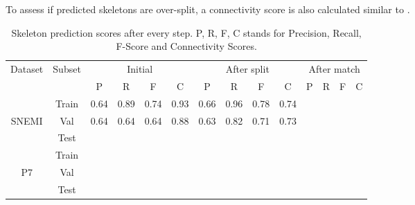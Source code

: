 To assess if predicted skeletons are over-split, a connectivity score is also calculated similar to \cite{Liang2019}.



\begin{table*}[!ht]                                                                                          
	\centering
	\begin{adjustbox}{width=\textwidth,center=\textwidth}
	\begin{tabular}{|c|c|c|c|c|c|c|c|c|c|c|c|c|c|}                                                                      
		\hline                                                                                                  
		\multirow{2}{*}{Dataset} & \multirow{2}{*}{Subset} & \multicolumn{4}{c|}{Initial}  & \multicolumn{4}{c|}{After split}  & \multicolumn{4}{c|}{After match} \\                                    
		\cline{3-14}                                                                                                  
		&  & P & R & F & C & P & R & F & C & P & R & F & C \\                                                           
		\hline                                                                                                  
		\hline                                                                                                  
				& Train & 0.64 & 0.89 & 0.74 & 0.93 & 0.66 & 0.96 & 0.78 & 0.74 &  &  &  &\\                           
		SNEMI 	& Val 	& 0.64 & 0.64 & 0.64 & 0.88 & 0.63 & 0.82 & 0.71 & 0.73 &  &  &  & \\           
				& Test 	&  &  &  &  &  &  &  &  &  &  &  & \\
		\hline		 
				& Train &  &  &  &  &  &  &  &  &  &  &  & \\                           
		P7 		& Val 	&  &  &  &  &  &  &  &  &  &  &  & \\           
				& Test 	&  &  &  &  &  &  &  &  &  &  &  & \\                          
		\hline                                                                                                     
	\end{tabular}
	\end{adjustbox}                                                
	\caption{Skeleton prediction scores after every step. P, R, F, C stands for Precision, Recall, F-Score and Connectivity Scores. }
	\label{tab:dissected_scores}                                                                   
\end{table*}